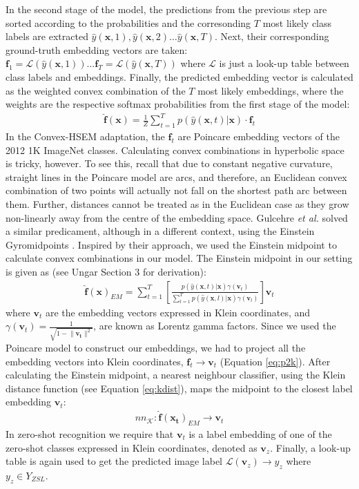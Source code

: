 \documentclass[12pt]{report}
\begin{document}
In the second stage of the model, the predictions from the previous step are sorted according to the probabilities and the corresonding $T$ most likely class labels are extracted $\hat{y}(\mathbf{x}, 1),\hat{y}(\mathbf{x}, 2) \dots \hat{y}(\mathbf{x}, T)$. Next, their corresponding ground-truth embedding vectors are taken: $\mathbf{f}_1 = \mathcal{L}(\hat{y}(\mathbf{x}, 1)) \dots \mathbf{f}_T = \mathcal{L}(\hat{y}(\mathbf{x}, T))$ where $\mathcal{L}$ is just a look-up table between class labels and embeddings. Finally, the predicted embedding vector is calculated as the weighted convex combination of the $T$ most likely embeddings, where the weights are the respective softmax probabilities from the first stage of the model:
\begin{align}
  \mathbf{\hat{f}(\mathbf{x})} = \frac{1}{Z}\sum_{t=1}^T p(\hat{y}(\mathbf{x}, t)| \mathbf{x}) \cdot \mathbf{f}_t
\end{align}
In the Convex-HSEM adaptation, the $\mathbf{f}_t$ are Poincare embedding vectors of the 2012 1K ImageNet classes. Calculating convex combinations in hyperbolic space is tricky, however. To see this, recall that due to constant negative curvature, straight lines in the Poincare model are arcs, and therefore, an Euclidean convex combination of two points will actually not fall on the shortest path arc between them. Further, distances cannot be treated as in the Euclidean case as they grow non-linearly away from the centre of the embedding space. Gulcehre \textit{et al.} \cite{Gulcehre2018} solved a similar predicament, although in a different context, using the Einstein Gyromidpoints \cite{Ungar2005, Ungar2009}. Inspired by their approach, we used the Einstein midpoint to calculate convex combinations in our model. The Einstein midpoint in our setting is given as (see Ungar \cite{Ungar2009} Section 3 for derivation):
\begin{align*}
  \mathbf{\hat{f}(\mathbf{x})}_{EM} = \sum_{t=1}^T \left[\frac{p(\hat{y}(\mathbf{x}, t)|\mathbf{x})\gamma(\mathbf{v}_t)}{\sum_{l=1}^T p(\hat{y}(\mathbf{x}, l)|\mathbf{x})\gamma(\mathbf{v}_l)}\right]\mathbf{v}_t
\end{align*}
where $\mathbf{v}_t$ are the embedding vectors expressed in Klein coordinates, and $\gamma(\mathbf{v}_t)=\frac{1}{\sqrt{1 - \lVert\mathbf{v_t}\rVert^2}}$, are known as Lorentz gamma factors. Since we used the Poincare model to construct our embeddings, we had to project all the embedding vectors into Klein coordinates, $\mathbf{f}_t \rightarrow \mathbf{v}_t$ (Equation \ref{eq:p2k}). After calculating the Einstein midpoint, a nearest neighbour classifier, using the Klein distance function (see Equation \ref{eq:kdist}), maps the midpoint to the closest label embedding $\mathbf{v}_t$:
\begin{align*}
  nn_{\mathcal{K}}: \mathbf{\hat{f}}(\mathbf{x_t})_{EM} \rightarrow \mathbf{v}_t
\end{align*}
In zero-shot recognition we require that $\mathbf{v}_t$ is a label embedding of one of the zero-shot classes expressed in Klein coordinates, denoted as $\mathbf{v}_z$. Finally, a look-up table is again used to get the predicted image label $\mathcal{L}(\mathbf{v}_z) \rightarrow y_z$ where $y_z \in Y_{ZSL}$.
\end{document}
